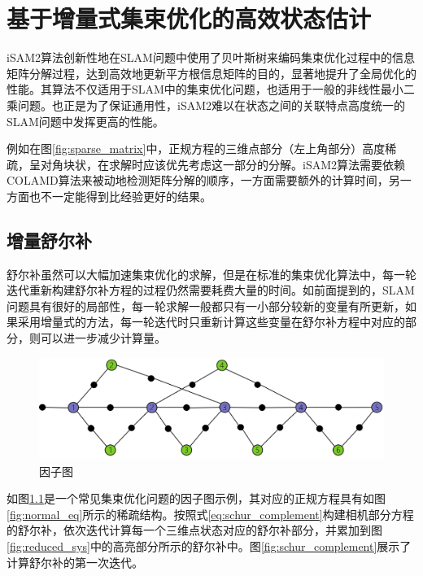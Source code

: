 \chapter{基于增量式集束优化的高效状态估计}\label{ch:ba}

iSAM2算法\cite{kaess2008isam,kaess2012isam2}创新性地在SLAM问题中使用了贝叶斯树来编码集束优化过程中的信息矩阵分解过程，达到高效地更新平方根信息矩阵的目的，显著地提升了全局优化的性能。其算法不仅适用于SLAM中的集束优化问题，也适用于一般的非线性最小二乘问题。也正是为了保证通用性，iSAM2难以在状态之间的关联特点高度统一的SLAM问题中发挥更高的性能。

例如在图\ref{fig:sparse_matrix}中，正规方程的三维点部分（左上角部分）高度稀疏，呈对角块状，在求解时应该优先考虑这一部分的分解。iSAM2算法需要依赖COLAMD\citep{davis2004algorithm}算法来被动地检测矩阵分解的顺序，一方面需要额外的计算时间，另一方面也不一定能得到比经验更好的结果。

\section{增量舒尔补}

舒尔补虽然可以大幅加速集束优化的求解，但是在标准的集束优化算法中，每一轮迭代重新构建舒尔补方程的过程仍然需要耗费大量的时间。如前面提到的，SLAM问题具有很好的局部性，每一轮求解一般都只有一小部分较新的变量有所更新，如果采用增量式的方法，每一轮迭代时只重新计算这些变量在舒尔补方程中对应的部分，则可以进一步减少计算量。

\begin{figure}[htb!]
    \centering
    \includegraphics[scale=.7]{figs/factor_graph.png}
    \caption{因子图}
    \label{fig:factor_graph}
\end{figure}

如图\ref{fig:factor_graph}是一个常见集束优化问题的因子图示例，其对应的正规方程具有如图\ref{fig:normal_eq}所示的稀疏结构。按照式\eqref{eq:schur_complement}构建相机部分方程的舒尔补，依次迭代计算每一个三维点状态对应的舒尔补部分，并累加到图\ref{fig:reduced_sys}中的高亮部分所示的舒尔补中。图\ref{fig:schur_complement}展示了计算舒尔补的第一次迭代。

